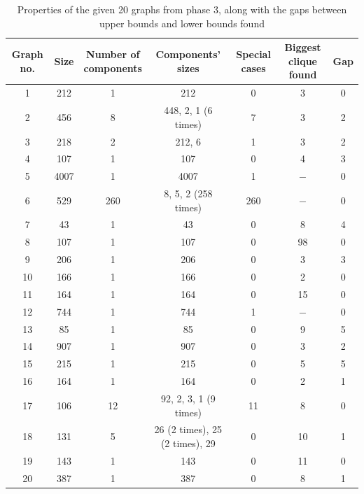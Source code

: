 \documentclass[a4paper]{report}
\begin{document}
	\begin{table} [h!]
		\begin{center}
			\begin{tabular}{| c | c | c | c |c|c|c|}
				\hline
				Graph no. & Size & \shortstack{Number of \\ components}& Components' sizes & Special cases&\shortstack{Biggest clique\\ found}& Gap \\
				\hline
				1 & 212 & 1 & 212 &0&3& 0\\
				\hline
				2 & 456 & 8 & 448, 2, 1 (6 times) &7&3& 2\\
				\hline
				3 & 218 & 2 & 212, 6 &1&3& 2\\
				\hline
				4 & 107 & 1 & 107 &0&4& 3\\
				\hline
				5 & 4007 & 1 & 4007 &1&$-$& 0\\
				\hline
				6 & 529 & 260 & 8, 5, 2 (258 times) &260&$-$& 0\\
				\hline
				7 & 43 & 1 & 43 &0&8& 4\\
				\hline
				8 & 107 & 1 & 107 &0&98& 0\\
				\hline
				9 & 206 & 1 & 206 &0&3& 3\\
				\hline
				10 & 166 & 1 & 166 &0&2& 0\\
				\hline
				11 & 164 & 1 & 164 &0&15& 0\\
				\hline
				12 & 744 & 1 & 744 &1&$-$& 0\\
				\hline
				13 & 85 & 1 & 85 &0&9& 5\\
				\hline
				14 & 907 & 1 & 907 &0&3& 2\\
				\hline
				15 & 215 & 1 & 215 &0&5& 5\\
				\hline
				16 & 164 & 1 & 164 &0&2& 1\\
				\hline
				17 & 106 & 12 & 92, 2, 3, 1 (9 times) &11&8& 0\\
				\hline
				18 & 131 & 5 & 26 (2 times), 25 (2 times), 29 &0&10& 1\\
				\hline
				19 & 143 & 1 & 143 &0&11& 0\\
				\hline
				20 & 387 & 1 & 387 &0&8& 1\\
				\hline
			\end{tabular}
		\end{center}
		\caption{Properties of the given 20 graphs from phase 3, along with the gaps between upper bounds and lower bounds found}
		\label{tab:prop}
	\end{table}
\end{document}
